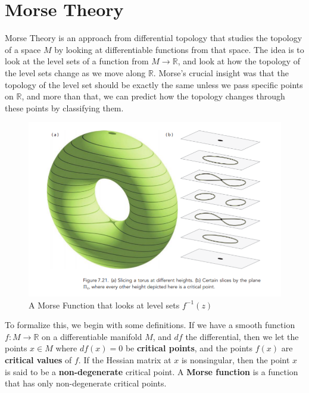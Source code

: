 \documentclass{article}
\begin{document}
\section{Morse Theory}
Morse Theory is an approach from differential topology that studies the topology of a space $M$ by looking at differentiable functions from that space. The idea is to look at the level sets of a function from $M \to \mathbb{R}$, and look at how the topology of the level sets change as we move along $\mathbb{R}$. Morse's crucial insight was that the topology of the level set should be exactly the same unless we pass specific points on $\mathbb{R}$, and more than that, we can predict how the topology changes through these points by classifying them.  
\begin{figure}[!ht]
    \centering
    \includegraphics[scale = .4]{morse.png}
    \caption{A Morse Function that looks at level sets $f^{-1}(z) $\cite{rourke}}
    \label{fig:my_label}
\end{figure}
To formalize this, we begin with some definitions. If we have a smooth function $f: M \to \mathbb{R}$ on a differentiable manifold $M$, and $df$ the differential, then we let the points $x \in M$ where $df(x) = 0$ be \textbf{critical points}, and the points $f(x)$ are \textbf{critical values} of $f$. If the Hessian matrix at $x$ is nonsingular, then the point $x$ is said to be a \textbf{non-degenerate} critical point. A \textbf{Morse function} is a function that has only non-degenerate critical points. 
\end{document}
